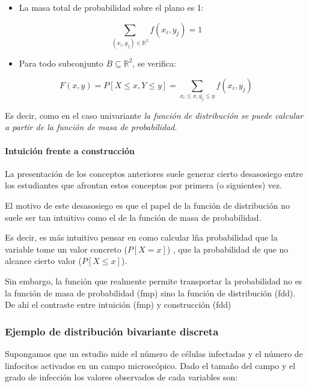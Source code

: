 \documentclass[
]{article}
\providecommand{\tightlist}{%
  \setlength{\itemsep}{0pt}\setlength{\parskip}{0pt}}
\begin{document}
\begin{itemize}
\tightlist
\item
  La masa total de probabilidad sobre el plano es 1:
\end{itemize}

\[
\sum_{(x_i, y_j) \in \mathbb{R}^{2}} f(x_i, y_j) = 1
\]

\begin{itemize}
\tightlist
\item
  Para todo subconjunto \(B \subseteq \mathbb{R}^2\), se verifica:
\end{itemize}

\[
F(x, y) = P[X \leq x, Y \leq y] = \sum_{x_i \leq x, y_j \leq y} f(x_i, y_j)
\]

Es decir, como en el caso univariante \emph{la función de distribución se puede calcular a partir de la función de masa de probabilidad}.

\paragraph{Intuición frente a construcción}\label{intuiciuxf3n-frente-a-construcciuxf3n}

La presentación de los conceptos anteriores suele generar cierto desasosiego entre los estudiantes que afrontan estos conceptos por primera (o siguientes) vez.

El motivo de este desasosiego es que el papel de la función de distribución no suele ser tan intuitivo como el de la función de masa de probabilidad.

Es decir, es más intuitivo pensar en como calcular lña probabilidad que la variable tome un valor concreto (\(P[X=x]\)) , que la probabilidad de que no alcance cierto valor (\(P[X\leq x]\)).

Sin embargo, la función que realmente permite transportar la probabilidad no es la función de masa de probabilidad (fmp) sino la función de distribución (fdd). De ahí el contraste entre intuición (fmp) y construcción (fdd)

\subsubsection{Ejemplo de distribución bivariante discreta}\label{ejemplo-de-distribuciuxf3n-bivariante-discreta}

Supongamos que un estudio mide el número de células infectadas y el número de linfocitos activados en un campo microscópico. Dado el tamaño del campo y el grado de infección los valores observados de cada variables son:
\end{document}
